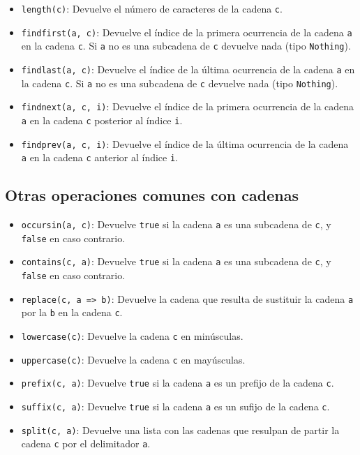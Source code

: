 \documentclass[
  letterpaper,
  DIV=11,
  numbers=noendperiod]{scrreprt}
\providecommand{\tightlist}{%
  \setlength{\itemsep}{0pt}\setlength{\parskip}{0pt}}\usepackage{longtable,booktabs,array}
\begin{document}
\begin{itemize}
\tightlist
\item
  \texttt{length(c)}: Devuelve el número de caracteres de la cadena
  \texttt{c}.
\item
  \texttt{findfirst(a,\ c)}: Devuelve el índice de la primera ocurrencia
  de la cadena \texttt{a} en la cadena \texttt{c}. Si \texttt{a} no es
  una subcadena de \texttt{c} devuelve nada (tipo \texttt{Nothing}).
\item
  \texttt{findlast(a,\ c)}: Devuelve el índice de la última ocurrencia
  de la cadena \texttt{a} en la cadena \texttt{c}. Si \texttt{a} no es
  una subcadena de \texttt{c} devuelve nada (tipo \texttt{Nothing}).
\item
  \texttt{findnext(a,\ c,\ i)}: Devuelve el índice de la primera
  ocurrencia de la cadena \texttt{a} en la cadena \texttt{c} posterior
  al índice \texttt{i}.
\item
  \texttt{findprev(a,\ c,\ i)}: Devuelve el índice de la última
  ocurrencia de la cadena \texttt{a} en la cadena \texttt{c} anterior al
  índice \texttt{i}.
\end{itemize}

\hypertarget{otras-operaciones-comunes-con-cadenas-1}{%
\subsection{Otras operaciones comunes con
cadenas}\label{otras-operaciones-comunes-con-cadenas-1}}

\begin{itemize}
\tightlist
\item
  \texttt{occursin(a,\ c)}: Devuelve \texttt{true} si la cadena
  \texttt{a} es una subcadena de \texttt{c}, y \texttt{false} en caso
  contrario.
\item
  \texttt{contains(c,\ a)}: Devuelve \texttt{true} si la cadena
  \texttt{a} es una subcadena de \texttt{c}, y \texttt{false} en caso
  contrario.
\item
  \texttt{replace(c,\ a\ =\textgreater{}\ b)}: Devuelve la cadena que
  resulta de sustituir la cadena \texttt{a} por la \texttt{b} en la
  cadena \texttt{c}.
\item
  \texttt{lowercase(c)}: Devuelve la cadena \texttt{c} en minúsculas.
\item
  \texttt{uppercase(c)}: Devuelve la cadena \texttt{c} en mayúsculas.
\item
  \texttt{prefix(c,\ a)}: Devuelve \texttt{true} si la cadena \texttt{a}
  es un prefijo de la cadena \texttt{c}.
\item
  \texttt{suffix(c,\ a)}: Devuelve \texttt{true} si la cadena \texttt{a}
  es un sufijo de la cadena \texttt{c}.
\item
  \texttt{split(c,\ a)}: Devuelve una lista con las cadenas que resulpan
  de partir la cadena \texttt{c} por el delimitador \texttt{a}.
\end{itemize}
\end{document}
